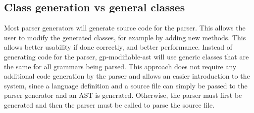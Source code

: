 
\subsection{Class generation vs general classes}

Most parser generators will generate source code for the parser.
This allows the user to modify the generated classes, for example by adding new methods. 
This allows better usability if done correctly, and better performance. 
Instead of generating code for the parser, gp-modifiable-ast will use generic classes that are the same for all grammars being parsed. 
This approach does not require any additional code generation by the parser and allows an easier introduction to the system, since a language definition and a source file can simply be passed to the parser generator and an 
AST is generated. Otherwise, the parser must first be generated and then the parser must be called to parse the source file.